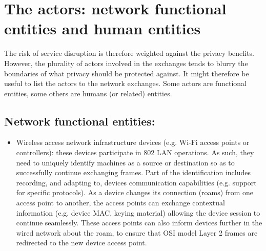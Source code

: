 \documentclass[10pt]{article}
\begin{document}
\section{The actors: network functional entities and human entities}{
	The risk of service disruption is therefore weighted against the privacy benefits. However, the plurality of actors involved in the exchanges tends to blurry the boundaries of what privacy should be protected against. It might therefore be useful to list the actors to the network exchanges. Some actors are functional entities, some others are humans (or related) entities.
	
	\subsection{Network functional entities:}{
	\begin{itemize}
	\item Wireless access network infrastructure devices (e.g. Wi-Fi access points or controllers): these devices participate in 802 LAN operations. As such, they need to uniquely identify machines as a source or destination so as to successfully continue exchanging frames. Part of the identification includes recording, and adapting to, devices communication capabilities (e.g. support for specific protocols). As a device changes its connection (roams) from one access point to another, the access points can exchange contextual information (e.g. device MAC, keying material) allowing the device session to continue seamlessly. These access points can also inform devices further in the wired network about the roam, to ensure that OSI model Layer 2 frames are redirected to the new device access point.

\end{itemize}}}
\end{document}

